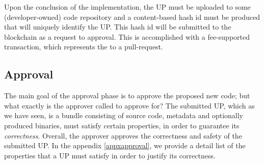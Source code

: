 Upon the conclusion of the implementation, the UP must be uploaded to some (developer-owned) code repository and a content-based hash id must be produced that will uniquely identify the UP. This hash id will be submitted to the blockchain as a request to approval. This is accomplished with a fee-supported transaction, which represents the  to a pull-request.

\subsection{Approval}



The main goal of the approval phase is to approve the proposed new code; but what exactly is the approver called to approve for? The submitted UP, which as we have seen, is a bundle consisting of source code, metadata and optionally produced binaries, must satisfy certain properties, in order to guarantee its \emph{correctness}. Overall, the approver approves the correctness and safety of the submitted UP. In the appendix \ref{appxapproval}, we provide a detail list of the properties that a UP must satisfy in order to justify its correctness.


